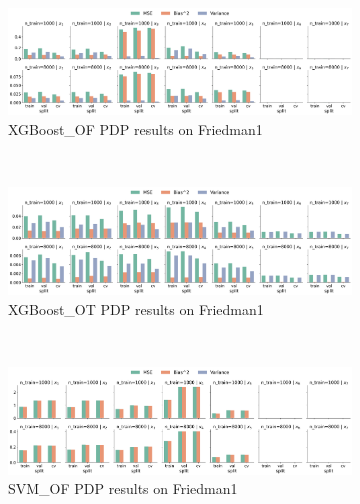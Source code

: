 \documentclass[runningheads]{llncs}
\begin{document}
\begin{figure}[ht]
    \centering
    \ContinuedFloat\
    \begin{subfigure}[b]{\textwidth}
        \centering
        \includegraphics[width=\textwidth]{img/Friedman1-all/feature_effect_errors_pdp_XGBoost_OF.png}
        \caption{XGBoost\_OF PDP results on Friedman1}
    \end{subfigure}
    \\[10pt]
    \vfill
    \begin{subfigure}[b]{\textwidth}
        \centering
        \includegraphics[width=\textwidth]{img/Friedman1-all/feature_effect_errors_pdp_XGBoost_OT.png}
        \caption{XGBoost\_OT PDP results on Friedman1}
    \end{subfigure}
    \\[10pt]
    \vfill
    \begin{subfigure}[b]{\textwidth}
        \centering
        \includegraphics[width=\textwidth]{img/Friedman1-all/feature_effect_errors_pdp_SVM_OF.png}
        \caption{SVM\_OF PDP results on Friedman1}
    \end{subfigure}
    \\[10pt]
    \vfill
    \begin{subfigure}[b]{\textwidth}

\end{subfigure}
\end{figure}
\end{document}
